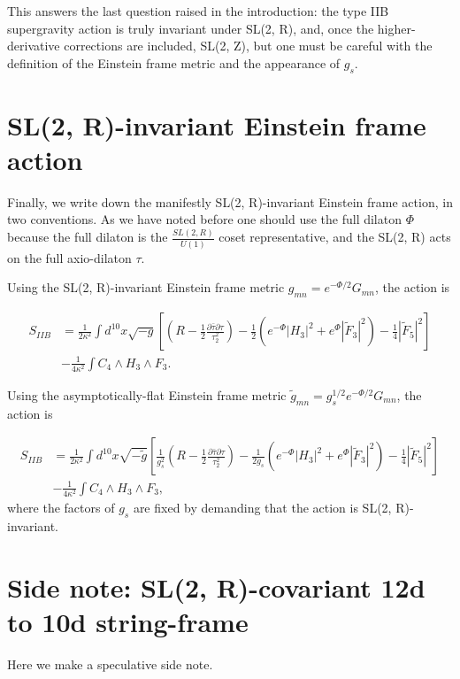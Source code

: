 This answers the last question raised in the introduction: the type IIB supergravity action is truly invariant under SL(2, R), and, once the higher-derivative corrections are included, SL(2, Z), but one must be careful with the definition of the Einstein frame metric and the appearance of $g_s$.


\section{SL(2, R)-invariant Einstein frame action}

Finally, we write down the manifestly SL(2, R)-invariant Einstein frame action, in two conventions. As we have noted before one should use the full dilaton $\Phi$ because the full dilaton is the $\frac{SL(2, R)}{U(1)}$ coset representative, and the SL(2, R) acts on the full axio-dilaton $\tau$.

Using the SL(2, R)-invariant Einstein frame metric $g_{mn} = e^{-\Phi/2}G_{mn}$, the action is

\begin{equation}
\begin{aligned}
S_{IIB}
&=\frac{1}{2\kappa^2} \int d^{10}x\sqrt{-g}\left[\left(R-\frac{1}{2}\frac{\partial\bar\tau\partial\tau}{\tau_2^2}\right)
-\frac{1}{2}\left(
e^{-\Phi}|H_3|^2+e^\Phi|\tilde{F}_3|^2
\right)
-\frac{1}{4}|\tilde F_5|^2
\right]\\
&-\frac{1}{4\kappa^2}\int C_4\wedge H_3\wedge F_3.
\end{aligned}
\end{equation}


Using the asymptotically-flat Einstein frame metric $\tilde{g}_{mn} = g_s^{1/2}e^{-\Phi/2}G_{mn}$, the action is

\begin{equation}
\begin{aligned}
S_{IIB}
&=\frac{1}{2\kappa^2} \int d^{10}x\sqrt{-\tilde{g}}\left[
\frac{1}{g_s^2}\left(R-\frac{1}{2}\frac{\partial\bar\tau\partial\tau}{\tau_2^2}\right)
-\frac{1}{2 g_s}\left(
e^{-\Phi}|H_3|^2+e^\Phi|\tilde{F}_3|^2
\right)
-\frac{1}{4}|\tilde F_5|^2
\right]\\
&-\frac{1}{4\kappa^2}\int C_4\wedge H_3\wedge F_3,
\end{aligned}
\end{equation}
where the factors of $g_s$ are fixed by demanding that the action is SL(2, R)-invariant.

\section{Side note: SL(2, R)-covariant 12d to 10d string-frame}
Here we make a speculative side note.

